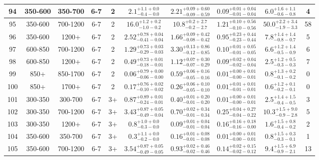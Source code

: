 \documentclass[11pt, oneside]{article}
\begin{document}
\begin{table}
{\begin{tabular}{ |c|c|c|c|c||c|c|c||c|c| }
94 & 350-600 & 350-700 & 6-7 & 2 & $2.1^{+1.1+0.0}_{-0.4-0.0}$ & $2.21^{+0.09+0.60}_{-0.09-0.59}$ & $0.09^{+0.01+0.04}_{-0.01-0.04}$ & $6.0^{+1.6+1.1}_{-0.6-0.8}$ & 4 \\ \hline
95 & 350-600 & 700-1200 & 6-7 & 2 & $16.0^{+1.2+0.2}_{-1.0-0.2}$ & $10.8^{+0.2+2.7}_{-0.2-2.7}$ & $1.21^{+0.10+0.56}_{-0.10-0.56}$ & $50.0^{+2.2+3.4}_{-1.9-3.3}$ & 58 \\ \hline
96 & 350-600 & 1200+ & 6-7 & 2 & $2.52^{+0.78+0.04}_{-0.41-0.04}$ & $1.66^{+0.09+0.42}_{-0.08-0.42}$ & $0.95^{+0.23+0.44}_{-0.23-0.44}$ & $7.8^{+1.4+1.4}_{-0.8-0.7}$ & 5 \\ \hline
97 & 600-850 & 700-1200 & 6-7 & 2 & $1.29^{+0.73+0.03}_{-0.29-0.03}$ & $3.30^{+0.13+0.86}_{-0.12-0.85}$ & $0.10^{+0.01+0.05}_{-0.01-0.05}$ & $6.6^{+1.2+1.4}_{-0.5-0.9}$ & 6 \\ \hline
98 & 600-850 & 1200+ & 6-7 & 2 & $0.49^{+0.73+0.01}_{-0.18-0.01}$ & $1.12^{+0.07+0.30}_{-0.07-0.29}$ & $0.09^{+0.02+0.04}_{-0.02-0.04}$ & $2.5^{+1.2+0.5}_{-0.3-0.3}$ & 7 \\ \hline
99 & 850+ & 850-1700 & 6-7 & 2 & $0.06^{+0.79+0.00}_{-0.06-0.00}$ & $0.59^{+0.06+0.16}_{-0.05-0.16}$ & $0.01^{+0.00+0.01}_{-0.00-0.01}$ & $0.8^{+1.3+0.2}_{-0.1-0.2}$ & 0 \\ \hline
100 & 850+ & 1700+ & 6-7 & 2 & $0.17^{+0.76+0.02}_{-0.10-0.02}$ & $0.26^{+0.06+0.10}_{-0.05-0.10}$ & $0.01^{+0.01+0.01}_{-0.01-0.01}$ & $0.6^{+1.2+0.1}_{-0.2-0.1}$ & 0 \\ \hline
101 & 300-350 & 300-700 & 6-7 & 3+ & $0.87^{+0.89+0.01}_{-0.24-0.01}$ & $0.40^{+0.01+0.20}_{-0.01-0.20}$ & $0.01^{+0.00+0.01}_{-0.00-0.01}$ & $2.5^{+1.4+1.5}_{-0.4-0.5}$ & 3 \\ \hline
102 & 300-350 & 700-1200 & 6-7 & 3+ & $3.43^{+0.87+0.05}_{-0.49-0.04}$ & $0.70^{+0.02+0.34}_{-0.01-0.34}$ & $0.25^{+0.04+0.27}_{-0.04-0.22}$ & $10.3^{+1.5+9.0}_{-0.9-2.8}$ & 5 \\ \hline
103 & 300-350 & 1200+ & 6-7 & 3+ & $0.8^{+1.0+0.0}_{-0.3-0.0}$ & $0.09^{+0.01+0.04}_{-0.01-0.04}$ & $0.16^{+0.16+0.18}_{-0.16-0.00}$ & $1.6^{+1.5+0.8}_{-0.4-0.2}$ & 2 \\ \hline
104 & 350-600 & 350-700 & 6-7 & 3+ & $0.3^{+1.1+0.0}_{-0.2-0.0}$ & $0.16^{+0.01+0.08}_{-0.01-0.08}$ & $0.01^{+0.00+0.01}_{-0.00-0.01}$ & $0.8^{+1.5+0.3}_{-0.3-0.1}$ & 1 \\ \hline
105 & 350-600 & 700-1200 & 6-7 & 3+ & $3.54^{+0.87+0.05}_{-0.49-0.05}$ & $0.93^{+0.02+0.46}_{-0.02-0.46}$ & $0.14^{+0.02+0.15}_{-0.02-0.12}$ & $9.4^{+1.5+6.9}_{-0.9-2.1}$ & 13 \\ \hline

\end{tabular}}
\end{table}
\end{document}
